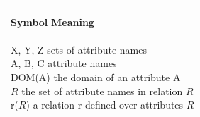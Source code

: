     
\begin{symbolindex}

{\renewcommand{\baselinestretch}{1}
\small\normalsize
\begin{tabbing}
\hspace*{4cm}\=\kill \\
{\bf Symbol} \>        {\bf Meaning}\\
\\
X, Y, Z \> 		 sets of attribute names\\
A, B, C \> 		 attribute names\\
DOM(A) \>  		 the domain of an attribute A\\
$R$ \>   		 the set of attribute names in relation $R$ \\
r($R$) \>  	         a relation r defined over attributes $R$ \\


\end{tabbing}}
\end{symbolindex}
